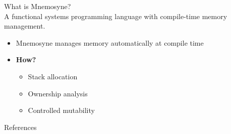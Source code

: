 \documentclass{beamer}
\begin{document}
\begin{frame}
\huge What is Mnemosyne? \normalsize \\
A functional systems programming language with \alert<1->{compile-time memory management}.
\begin{itemize}
    \item Mnemosyne manages memory automatically at compile time
    \item \textbf{How?}
    \begin{itemize}
    \item<2-> Stack allocation
    \item<2-> Ownership analysis
    \item<2-> Controlled mutability
\end{itemize}
\end{itemize}
\end{frame}

\begin{frame}
    \huge References \normalsize \\

    \printbibliography
\end{frame}
\end{document}
